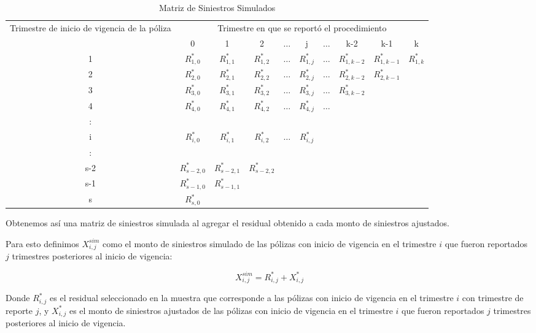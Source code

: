\documentclass[11pt,twoside,openright,spanish]{report}
\numberwithin{equation}{chapter}
\numberwithin{figure}{chapter}
\numberwithin{table}{chapter}
\begin{document}
	\begin{table}[H]
		\centering
			\caption{Matriz de Siniestros Simulados}
		\begin{tabularx}{\linewidth}{ c |ccccccccc}
			\multirow{2}{4cm}{Trimestre de inicio de vigencia de la póliza}& \multicolumn{9}{c}{Trimestre en que se reportó el procedimiento} \\
			& 0  & 1 & 2 & $ \dots $ & j & $\dots $ & k-2 & k-1 &  k\\
			\midrule
			1      &  $R_{1,0}^{*}$ & $R_{1,1}^{*}$ & $R_{1,2}^{*}$ & $ \dots $ & $R_{1,j}^{*}$ & $ \dots $ & $R_{1,k-2}^{*}$ & $R_{1,k-1}^{*}$ & $R_{1,k}^{*}$ \\
			2      &  $R_{2,0}^{*}$ & $R_{2,1}^{*}$ & $R_{2,2}^{*}$ & $ \dots $ & $R_{2,j}^{*}$ & $ \dots $ & $R_{2,k-2}^{*}$ & $R_{2,k-1}^{*}$ & \\
			3      &  $R_{3,0}^{*}$ & $R_{3,1}^{*}$ & $R_{3,2}^{*}$ & $ \dots $ & $R_{3,j}^{*}$ & $ \dots $ & $R_{3,k-2}^{*}$ & & \\
			4      &  $R_{4,0}^{*}$ & $R_{4,1}^{*}$ & $R_{4,2}^{*}$ & $ \dots $ & $R_{4,j}^{*}$ & $ \dots $ & & & \\
			:      & & & & & & & & & \\
			i      &  $R_{i,0}^{*}$ & $R_{i,1}^{*}$ & $R_{i,2}^{*}$ & $ \dots $ & $R_{i,j}^{*}$ & & & & \\
			:      & & & & & & & & & \\
			s-2      &  $R_{s-2,0}^{*}$ & $R_{s-2,1}^{*}$ & $R_{s-2,2}^{*}$ & & & & & & \\
			s-1      &  $R_{s-1,0}^{*}$ & $R_{s-1,1}^{*}$ & & & & & & & \\
			s      &  $R_{s,0}^{*}$ & & & & & & & & \\
		\end{tabularx}
	\end{table}

	Obtenemos así una matriz de siniestros simulada al agregar el residual obtenido a cada monto de siniestros ajustados.
	
	Para esto definimos $X_{i,j}^{sim}$ como el monto de siniestros simulado de las pólizas con inicio de vigencia en el trimestre $i$ que fueron reportados $j$ trimestres posteriores al inicio de vigencia:
	
	$$X_{i,j}^{sim}=R_{i,j}^{*}+X_{i,j}^{*}$$ 
	
	Donde $R_{i,j}^{*}$ es el residual seleccionado en la muestra que corresponde a las pólizas con inicio de vigencia en el trimestre $i$ con trimestre de reporte $j$, y $X_{i,j}^{*}$ es el monto de siniestros ajustados de las pólizas con inicio de vigencia en el trimestre $i$ que fueron reportados $j$ trimestres posteriores al inicio de vigencia.
	
\end{document}
